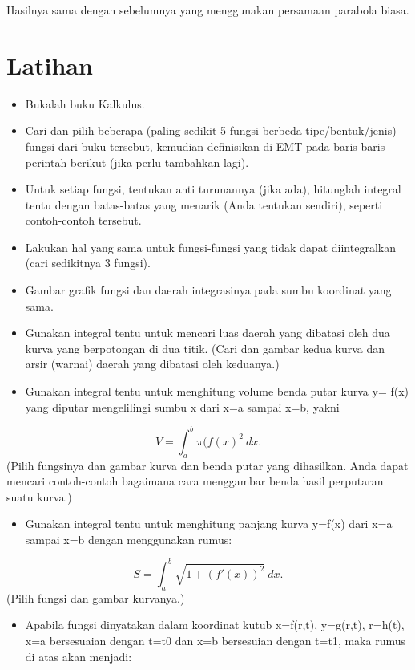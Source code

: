 \documentclass[
]{book}
\providecommand{\tightlist}{%
  \setlength{\itemsep}{0pt}\setlength{\parskip}{0pt}}
\begin{document}
Hasilnya sama dengan sebelumnya yang menggunakan persamaan parabola biasa.

\chapter{Latihan}\label{latihan-3}

\begin{itemize}
\item
  Bukalah buku Kalkulus.
\item
  Cari dan pilih beberapa (paling sedikit 5 fungsi berbeda tipe/bentuk/jenis) fungsi dari buku tersebut, kemudian definisikan di EMT pada baris-baris perintah berikut (jika perlu tambahkan lagi).
\item
  Untuk setiap fungsi, tentukan anti turunannya (jika ada), hitunglah integral tentu dengan batas-batas yang menarik (Anda tentukan sendiri), seperti contoh-contoh tersebut.
\item
  Lakukan hal yang sama untuk fungsi-fungsi yang tidak dapat diintegralkan (cari sedikitnya 3 fungsi).
\item
  Gambar grafik fungsi dan daerah integrasinya pada sumbu koordinat yang sama.
\item
  Gunakan integral tentu untuk mencari luas daerah yang dibatasi oleh dua kurva yang berpotongan di dua titik. (Cari dan gambar kedua kurva dan arsir (warnai) daerah yang dibatasi oleh keduanya.)
\item
  Gunakan integral tentu untuk menghitung volume benda putar kurva y= f(x) yang diputar mengelilingi sumbu x dari x=a sampai x=b, yakni
\end{itemize}

\[V = \int_a^b \pi (f(x)^2\ dx.\](Pilih fungsinya dan gambar kurva dan benda putar yang dihasilkan. Anda dapat mencari contoh-contoh bagaimana cara menggambar benda hasil perputaran suatu kurva.)

\begin{itemize}
\tightlist
\item
  Gunakan integral tentu untuk menghitung panjang kurva y=f(x) dari x=a sampai x=b dengan menggunakan rumus:
\end{itemize}

\[S = \int_a^b \sqrt{1+(f'(x))^2} \ dx.\](Pilih fungsi dan gambar kurvanya.)

\begin{itemize}
\tightlist
\item
  Apabila fungsi dinyatakan dalam koordinat kutub x=f(r,t), y=g(r,t), r=h(t), x=a bersesuaian dengan t=t0 dan x=b bersesuian dengan t=t1, maka rumus di atas akan menjadi:
\end{itemize}
\end{document}
